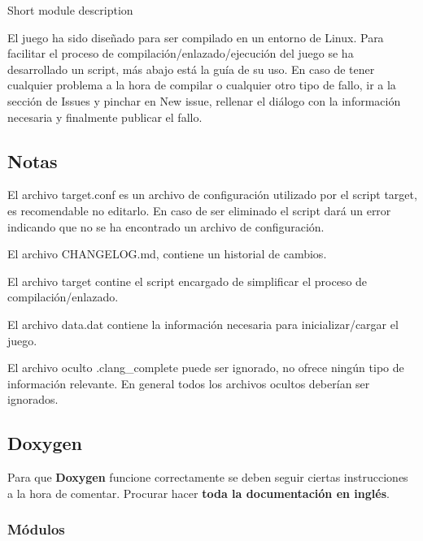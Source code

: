 Short module description
\begin{DoxyItemize}
\item El juego ha sido diseñado para ser compilado en un entorno de Linux. Para facilitar el proceso de compilación/enlazado/ejecución del juego se ha desarrollado un script, más abajo está la guía de su uso. En caso de tener cualquier problema a la hora de compilar o cualquier otro tipo de fallo, ir a la sección de {\ttfamily Issues} y pinchar en {\ttfamily New issue}, rellenar el diálogo con la información necesaria y finalmente publicar el fallo.
\end{DoxyItemize}

\subsection*{Notas}


\begin{DoxyItemize}
\item El archivo {\ttfamily target.\+conf} es un archivo de configuración utilizado por el script {\ttfamily target}, es recomendable no editarlo. En caso de ser eliminado el script dará un error indicando que no se ha encontrado un archivo de configuración.
\item El archivo {\ttfamily C\+H\+A\+N\+G\+E\+L\+O\+G.\+md}, contiene un historial de cambios.
\item El archivo {\ttfamily target} contine el script encargado de simplificar el proceso de compilación/enlazado.
\item El archivo {\ttfamily data.\+dat} contiene la información necesaria para inicializar/cargar el juego.
\item El archivo oculto {\ttfamily .clang\+\_\+complete} puede ser ignorado, no ofrece ningún tipo de información relevante. En general todos los archivos ocultos deberían ser ignorados.
\end{DoxyItemize}

\subsection*{Doxygen}

Para que {\bfseries Doxygen} funcione correctamente se deben seguir ciertas instrucciones a la hora de comentar. Procurar hacer {\bfseries toda la documentación en inglés}.

\subsubsection*{Módulos}


